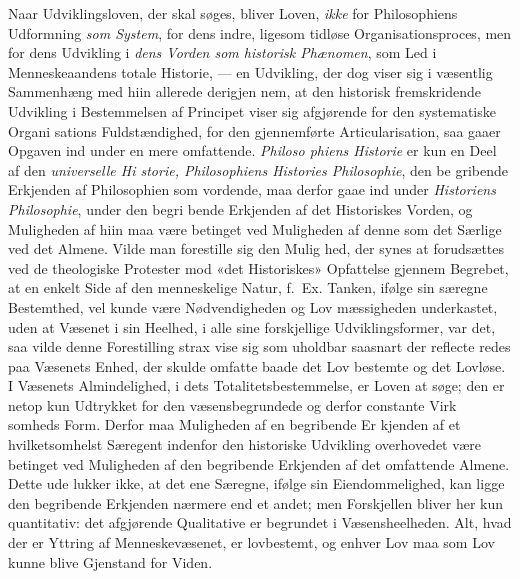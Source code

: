 Naar Udviklingsloven, der skal søges, bliver Loven, \emph{ikke}
for Philosophiens Udformning \emph{som System}, for dens indre,
ligesom tidløse Organisationsproces, men for dens Udvikling i
\emph{dens Vorden som historisk Phænomen}, som Led i
Menneskeaandens totale Historie, --- en Udvikling, der dog
viser sig i væsentlig Sammenhæng med hiin allerede derigjen\-%
nem, at den historisk fremskridende Udvikling i Bestemmelsen
af Principet viser sig afgjørende for den systematiske Organi\-%
sations Fuldstændighed, for den gjennemførte Articularisation,
saa gaaer Opgaven ind under en mere omfattende. \emph{Philoso\-%
phiens Historie} er kun en Deel af den \emph{universelle Hi\-%
storie, Philosophiens Histories Philosophie}, den be\-%
gribende Erkjenden af Philosophien som vordende, maa derfor
gaae ind under \emph{Historiens Philosophie}, under den begri\-%
bende Erkjenden af det Historiskes Vorden, og Muligheden af
hiin maa være betinget ved Muligheden af denne som det
Særlige ved det Almene. Vilde man forestille sig den Mulig\-%
hed, der synes at forudsættes ved de theologiske Protester mod
«det Historiskes» Opfattelse gjennem Begrebet, at en enkelt
Side af den menneskelige Natur, f.\ Ex. Tanken, ifølge sin
 særegne Bestemthed, vel kunde være Nødvendigheden og Lov\-%
mæssigheden underkastet, uden at Væsenet i sin Heelhed, i
alle sine forskjellige Udviklingsformer, var det, saa vilde denne
Forestilling strax vise sig som uholdbar saasnart der reflecte\-%
redes paa Væsenets Enhed, der skulde omfatte baade det Lov\-%
bestemte og det Lovløse. I Væsenets Almindelighed, i dets
Totalitetsbestemmelse, er Loven at søge; den er netop kun
Udtrykket for den væsensbegrundede og derfor constante Virk\-%
somheds Form. Derfor maa Muligheden af en begribende Er\-%
kjenden af et hvilketsomhelst Særegent indenfor den historiske
Udvikling overhovedet være betinget ved Muligheden af den
begribende Erkjenden af det omfattende Almene. Dette ude\-%
lukker ikke, at det ene Særegne, ifølge sin Eiendommelighed,
kan ligge den begribende Erkjenden nærmere end et andet;
men Forskjellen bliver her kun quantitativ: det afgjørende
Qualitative er begrundet i Væsensheelheden. Alt, hvad der er
Yttring af Menneskevæsenet, er lovbestemt, og enhver Lov
maa som Lov kunne blive Gjenstand for Viden.

